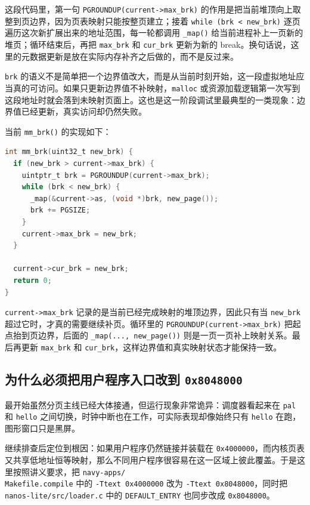 \documentclass[a4paper]{article}
\begin{document}
这段代码里，第一句 \texttt{PGROUNDUP(current->max\_brk)} 的作用是把当前堆顶向上取整到页边界，因为页表映射只能按整页建立；接着 \texttt{while (brk < new\_brk)} 逐页遍历这次新扩展出来的地址范围，每一轮都调用 \texttt{\_map()} 给当前进程补上一页新的堆页；循环结束后，再把 \texttt{max\_brk} 和 \texttt{cur\_brk} 更新为新的 break。换句话说，这里的元数据更新是放在实际内存补齐之后做的，而不是反过来。

\texttt{brk} 的语义不是简单把一个边界值改大，而是从当前时刻开始，这一段虚拟地址应当真的可访问。如果只更新边界值不补映射，\texttt{malloc} 或资源加载逻辑第一次写到这段地址时就会落到未映射页面上。这也是这一阶段调试里最典型的一类现象：边界值已经更新，真实访问却仍然失败。

当前 \texttt{mm\_brk()} 的实现如下：
\begin{lstlisting}[language=C]
int mm_brk(uint32_t new_brk) {
  if (new_brk > current->max_brk) {
    uintptr_t brk = PGROUNDUP(current->max_brk);
    while (brk < new_brk) {
      _map(&current->as, (void *)brk, new_page());
      brk += PGSIZE;
    }
    current->max_brk = new_brk;
  }

  current->cur_brk = new_brk;
  return 0;
}
\end{lstlisting}

\texttt{current->max\_brk} 记录的是当前已经完成映射的堆顶边界，因此只有当 \texttt{new\_brk} 超过它时，才真的需要继续补页。循环里的 \texttt{PGROUNDUP(current->max\_brk)} 把起点抬到页边界，后面的 \texttt{\_map(..., new\_page())} 则是一页一页补上映射关系。最后再更新 \texttt{max\_brk} 和 \texttt{cur\_brk}，这样边界值和真实映射状态才能保持一致。

\subsection{为什么必须把用户程序入口改到 \texttt{0x8048000}}
最开始虽然分页主线已经大体接通，但运行现象非常诡异：调度器看起来在 \texttt{pal} 和 \texttt{hello} 之间切换，时钟中断也在工作，可实际表现却像始终只有 \texttt{hello} 在跑，图形窗口只是黑屏。

继续排查后定位到根因：如果用户程序仍然链接并装载在 \texttt{0x4000000}，而内核页表又共享低地址恒等映射，那么不同用户程序很容易在这一区域上彼此覆盖。于是这里按照讲义要求，把 \texttt{navy-apps/}\\\texttt{Makefile.compile} 中的 \texttt{-Ttext 0x4000000} 改为 \texttt{-Ttext 0x8048000}，同时把 \texttt{nanos-lite/}\texttt{src/loader.c} 中的 \texttt{DEFAULT\_ENTRY} 也同步改成 \texttt{0x8048000}。
\end{document}
